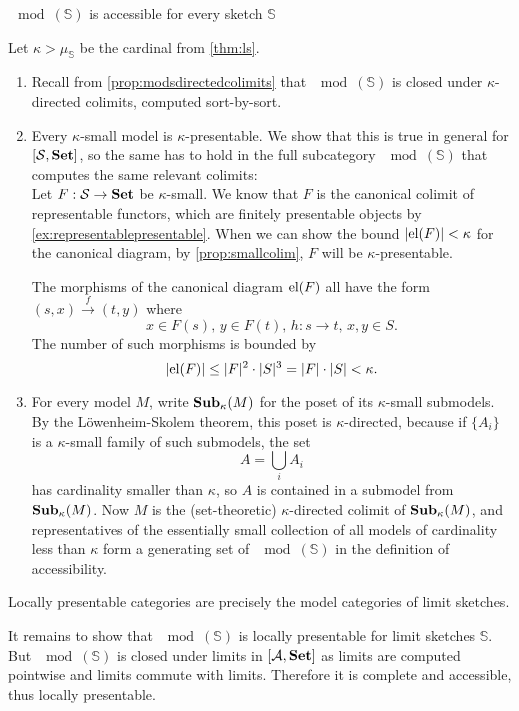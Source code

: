 \begin{Theorem}
$\mod(\mathbb S)$ is accessible for every sketch $\mathbb S$
\end{Theorem}
\begin{Proof}
Let $\kappa > \mu_\mathbb S$ be the cardinal from \ref{thm:ls}.
\begin{enumerate}
\item Recall from \ref{prop:modsdirectedcolimits} that $\mod(\mathbb S)$ is closed under $\kappa$-directed colimits, computed sort-by-sort.
\item Every $\kappa$-small model is $\kappa$-presentable. We show that this is true in general for $[\mathcal{S},\mathbf{Set}]$, so the same has to hold in the full subcategory $\mod(\mathbb S)$ that computes the same relevant colimits: \\

Let $F : \mathcal{S} \to \mathbf{Set}$ be $\kappa$-small. We know that $F$ is the canonical colimit of representable functors, which are finitely presentable objects by \ref{ex:representablepresentable}. When we can show the bound $|\textrm{el}(F)| < \kappa$ for the canonical diagram, by \ref{prop:smallcolim}, $F$ will be $\kappa$-presentable.

The morphisms of the canonical diagram $\textrm{el}(F)$ all have the form $(s,x) \xrightarrow{f} (t,y)$ where
\[ x \in F(s),\, y \in F(t),\, h : s \to t,\, x, y \in S. \]
The number of such morphisms is bounded by
\[ |\textrm{el}(F)| \leq |F|^2 \cdot |S|^3 = |F|\cdot |S| < \kappa. \]

\item For every model $M$, write $\mathbf{Sub}_\kappa(M)$ for the poset of its $\kappa$-small submodels. By the Löwenheim-Skolem theorem, this poset is $\kappa$-directed, because if $\{A_i\}$ is a $\kappa$-small family of such submodels, the set
\[ A = \bigcup_i A_i \]
has cardinality smaller than $\kappa$, so $A$ is contained in a submodel from $\mathbf{Sub}_\kappa(M)$. Now $M$ is the (set-theoretic) $\kappa$-directed colimit of $\mathbf{Sub}_\kappa(M)$, and representatives of the essentially small collection of all models of cardinality less than $\kappa$ form a generating set of $\mod(\mathbb S)$ in the definition of accessibility. %
\end{enumerate}
\end{Proof}

\begin{Corollary}
Locally presentable categories are precisely the model categories of limit sketches.
\end{Corollary}
\begin{Proof}
It remains to show that $\mod(\mathbb S)$ is locally presentable for limit sketches $\mathbb S$. But $\mod(\mathbb S)$ is closed under limits in $[\mathcal{A},\mathbf{Set}]$ as limits are computed pointwise and limits commute with limits. Therefore it is complete and accessible, thus locally presentable.
\end{Proof}

